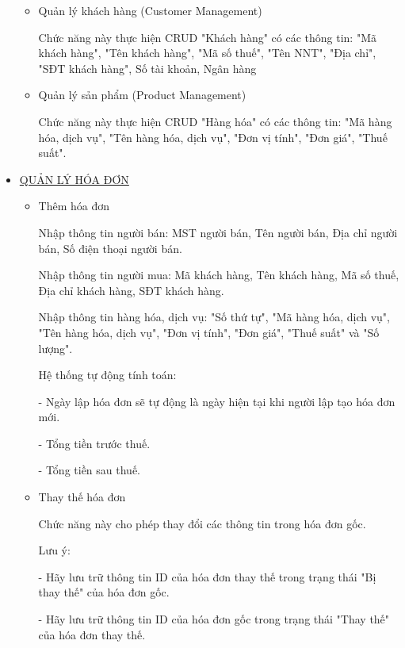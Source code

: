 \begin{itemize}
\begin{itemize}
              \item Quản lý khách hàng (Customer Management)

                    Chức năng này thực hiện CRUD "Khách hàng" có các thông tin: "Mã khách hàng", "Tên khách hàng", "Mã số thuế", "Tên NNT", "Địa chỉ", "SĐT khách hàng", Số tài khoản, Ngân hàng

              \item Quản lý sản phẩm (Product Management)

                    Chức năng này thực hiện CRUD "Hàng hóa" có các thông tin: "Mã hàng hóa, dịch vụ", "Tên hàng hóa, dịch vụ", "Đơn vị tính", "Đơn giá", "Thuế suất".

          \end{itemize}

    \item \underline{QUẢN LÝ HÓA ĐƠN}

          \begin{itemize}

              \item Thêm hóa đơn

                    Nhập thông tin người bán: MST người bán, Tên người bán, Địa chỉ người bán, Số điện thoại người bán.

                    Nhập thông tin người mua: Mã khách hàng, Tên khách hàng, Mã số thuế, Địa chỉ khách hàng, SĐT khách hàng.

                    Nhập thông tin hàng hóa, dịch vụ: "Số thứ tự", "Mã hàng hóa, dịch vụ", "Tên hàng hóa, dịch vụ", "Đơn vị tính", "Đơn giá", "Thuế suất" và "Số lượng".

                    Hệ thống tự động tính toán:

                    - Ngày lập hóa đơn sẽ tự động là ngày hiện tại khi người lập tạo hóa đơn mới.

                    - Tổng tiền trước thuế.

                    - Tổng tiền sau thuế.

              \item Thay thế hóa đơn

                    Chức năng này cho phép thay đổi các thông tin trong hóa đơn gốc.

                    Lưu ý:

                    - Hãy lưu trữ thông tin ID của hóa đơn thay thế trong trạng thái "Bị thay thế" của hóa đơn gốc.

                    - Hãy lưu trữ thông tin ID của hóa đơn gốc trong trạng thái "Thay thế" của hóa đơn thay thế.


\end{itemize}
\end{itemize}
